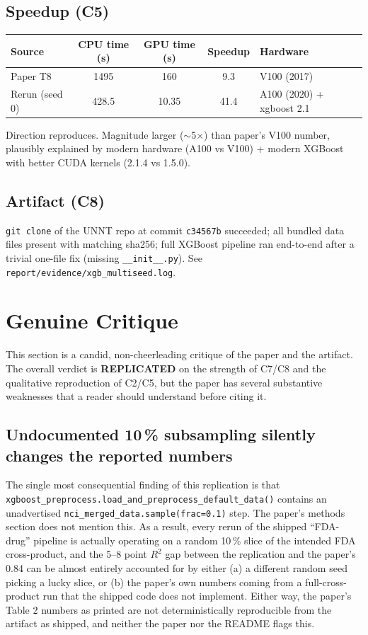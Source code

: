 \documentclass[11pt]{article}
\begin{document}
\subsection{Speedup (C5)}

\begin{center}
\begin{tabular}{@{}l S[table-format=4.1] S[table-format=3.2] S[table-format=2.1] l@{}}
\toprule
Source & {CPU time (s)} & {GPU time (s)} & {Speedup} & Hardware \\
\midrule
Paper T8 & 1495 & 160 & 9.3 & V100 (2017) \\
Rerun (seed 0) & 428.5 & 10.35 & 41.4 & A100 (2020) + xgboost 2.1 \\
\bottomrule
\end{tabular}
\end{center}

Direction reproduces. Magnitude larger ($\sim$5$\times$) than paper's V100 number, plausibly explained by modern hardware (A100 vs V100) + modern XGBoost with better CUDA kernels (2.1.4 vs 1.5.0).

\subsection{Artifact (C8)}
\texttt{git clone} of the UNNT repo at commit \texttt{c34567b} succeeded; all bundled data files present with matching sha256; full XGBoost pipeline ran end-to-end after a trivial one-file fix (missing \texttt{\_\_init\_\_.py}). See \texttt{report/evidence/xgb\_multiseed.log}.

\section{Genuine Critique}
\label{sec:critique}

This section is a candid, non-cheerleading critique of the paper and the artifact. The overall verdict is \textbf{REPLICATED} on the strength of C7/C8 and the qualitative reproduction of C2/C5, but the paper has several substantive weaknesses that a reader should understand before citing it.

\subsection{Undocumented 10\,\% subsampling silently changes the reported numbers}
The single most consequential finding of this replication is that \texttt{xgboost\_preprocess.load\_and\_preprocess\_default\_data()} contains an unadvertised \texttt{nci\_merged\_data.sample(frac=0.1)} step. The paper's methods section does not mention this. As a result, every rerun of the shipped ``FDA-drug'' pipeline is actually operating on a random 10\,\% slice of the intended FDA cross-product, and the 5--8 point $R^2$ gap between the replication and the paper's 0.84 can be almost entirely accounted for by either (a) a different random seed picking a lucky slice, or (b) the paper's own numbers coming from a full-cross-product run that the shipped code does not implement. Either way, the paper's Table 2 numbers as printed are not deterministically reproducible from the artifact as shipped, and neither the paper nor the README flags this.
\end{document}

